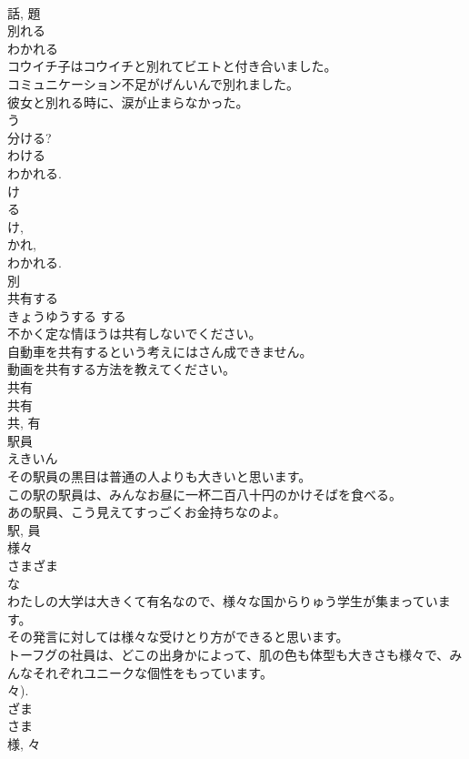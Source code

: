 \documentclass[8pt]{extreport}
\begin{document}
\begin{CJK}{UTF8}{min}
\\	話, 題	
\\	別れる	
\\	わかれる	
\\	コウイチ子はコウイチと別れてビエトと付き合いました。	
\\	コミュニケーション不足がげんいんで別れました。	
\\	彼女と別れる時に、涙が止まらなかった。	
\\	う 
\\	分ける? 
\\	わける 
\\	わかれる. 
\\	け 
\\	る 
\\	け, 
\\	かれ, 
\\	わかれる.
\\	別	
\\	共有する	
\\	きょうゆうする	する 
\\	不かく定な情ほうは共有しないでください。	
\\	自動車を共有するという考えにはさん成できません。	
\\	動画を共有する方法を教えてください。	
\\	共有 
\\	共有 
\\	共, 有	
\\	駅員	
\\	えきいん	
\\	その駅員の黒目は普通の人よりも大きいと思います。	
\\	この駅の駅員は、みんなお昼に一杯二百八十円のかけそばを食べる。	
\\	あの駅員、こう見えてすっごくお金持ちなのよ。	
\\	駅, 員	
\\	様々	
\\	さまざま	
\\	な 
\\	わたしの大学は大きくて有名なので、様々な国からりゅう学生が集まっています。	
\\	その発言に対しては様々な受けとり方ができると思います。	
\\	トーフグの社員は、どこの出身かによって、肌の色も体型も大きさも様々で、みんなそれぞれユニークな個性をもっています。	
\\	々). 
\\	ざま 
\\	さま 
\\	様, 々	

\end{CJK}
\end{document}
